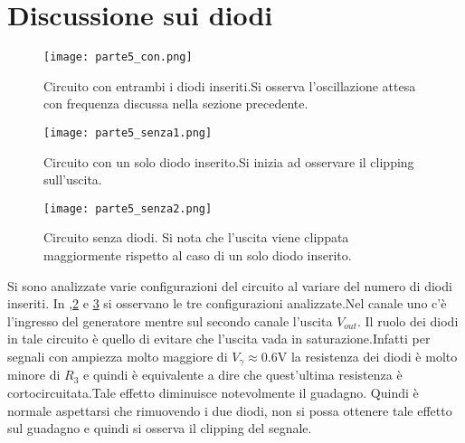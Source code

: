 \section{Discussione sui diodi}
\begin{figure}[h]
	\centering
	\texttt{[image: parte5\_con.png]}
	\caption{Circuito con entrambi i diodi inseriti.Si osserva l'oscillazione attesa con frequenza discussa nella sezione precedente.}
	\label{f:con_diodi}
\end{figure}	

\begin{figure}[h]
	\centering
	\texttt{[image: parte5\_senza1.png]}
	\caption{Circuito con un solo diodo inserito.Si inizia ad osservare il clipping sull'uscita.}
	\label{f:senza_1diodo}
\end{figure}

\begin{figure}[h]
	\centering
	\texttt{[image: parte5\_senza2.png]}
	\caption{Circuito senza diodi. Si nota che l'uscita viene clippata maggiormente rispetto al caso di un solo diodo inserito.}
	\label{f:senza_2diodi}
\end{figure}
Si sono analizzate varie configurazioni del circuito al variare del numero di diodi inseriti. In ,\ref{f:senza_1diodo} e \ref{f:senza_2diodi} si osservano le tre configurazioni analizzate.Nel canale uno c'è l'ingresso del generatore mentre sul secondo canale l'uscita $V_{out}$.
Il ruolo dei diodi in tale circuito è quello di evitare che l'uscita vada in saturazione.Infatti per segnali con ampiezza molto maggiore di $V_\gamma \approx 0.6$V la resistenza dei diodi è molto minore di $R_3$ e quindi è equivalente a dire che quest'ultima resistenza è cortocircuitata.Tale effetto diminuisce notevolmente il guadagno. Quindi è normale aspettarsi che rimuovendo i due diodi, non si possa ottenere tale effetto sul guadagno e quindi si osserva il clipping del segnale.
